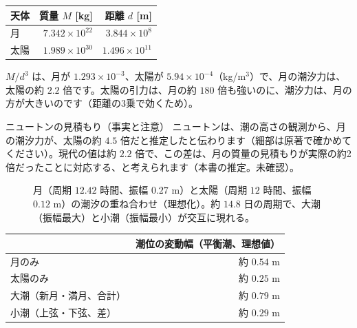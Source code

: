 \documentclass[a4paper,11pt,openany]{ltjsbook}
\begin{document}
\begin{center}
\begin{tabular}{lrr}
\toprule
天体 & 質量 $M$ [kg] & 距離 $d$ [m]\\
\midrule
月 & $7.342\times10^{22}$ & $3.844\times10^8$\\
太陽 & $1.989\times10^{30}$ & $1.496\times10^{11}$\\
\bottomrule
\end{tabular}
\end{center}

$M/d^3$ は、月が $1.293\times10^{-3}$、太陽が $5.94\times10^{-4}$（kg/m$^3$）で、月の潮汐力は、太陽の約 $2.2$ 倍です。太陽の引力は、月の約 $180$ 倍も強いのに、潮汐力は、月の方が大きいのです（距離の3乗で効くため）。

\begin{notebox}{ニュートンの見積もり（事実と注意）}
ニュートンは、潮の高さの観測から、月の潮汐力が、太陽の約 $4.5$ 倍だと推定したと伝わります（細部は原著で確かめてください）。現代の値は約 $2.2$ 倍で、この差は、月の質量の見積もりが実際の約2倍だったことに対応する、と考えられます（本書の推定。未確認）。
\end{notebox}

\begin{figure}[htbp]
\centering
{}
\caption{月（周期 $12.42$ 時間、振幅 $0.27$ m）と太陽（周期 $12$ 時間、振幅 $0.12$ m）の潮汐の重ね合わせ（理想化）。約 $14.8$ 日の周期で、大潮（振幅最大）と小潮（振幅最小）が交互に現れる。}
\end{figure}

\begin{center}
\begin{tabular}{lr}
\toprule
 & 潮位の変動幅（平衡潮、理想値）\\
\midrule
月のみ & 約 $0.54$ m\\
太陽のみ & 約 $0.25$ m\\
大潮（新月・満月、合計） & 約 $0.79$ m\\
小潮（上弦・下弦、差） & 約 $0.29$ m\\
\bottomrule
\end{tabular}
\end{center}
\end{document}
